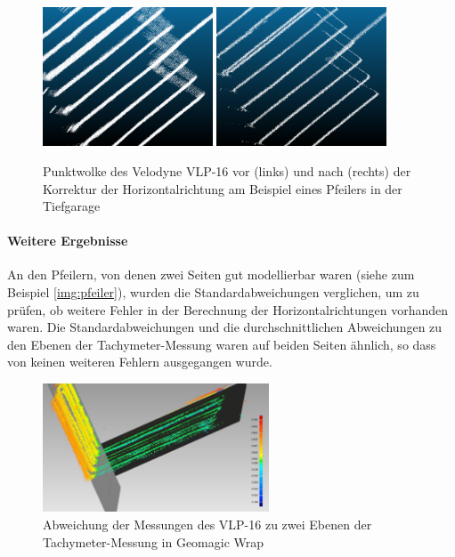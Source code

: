 \documentclass[a4paper,12pt,bibliography=totoc, listof=totoc,titlepage,pointlessnumbers]{scrreprt}
\begin{document}
\begin{figure}[!ht]
 \centering
 \includegraphics[width=0.45\textwidth]{./img/punktwolke_f.png}
 \includegraphics[width=0.45\textwidth]{./img/punktwolke_k.png}
 \caption{Punktwolke des Velodyne VLP-16 vor (links) und nach (rechts) der Korrektur der Horizontalrichtung am Beispiel eines Pfeilers in der Tiefgarage}
 \label{img:fehlerWolke}
\end{figure}

\paragraph{Weitere Ergebnisse}
An den Pfeilern, von denen zwei Seiten gut modellierbar waren (siehe zum Beispiel \autoref{img:pfeiler}), wurden die Standardabweichungen verglichen, um zu prüfen, ob weitere Fehler in der Berechnung der Horizontalrichtungen vorhanden waren. Die Standardabweichungen und die durchschnittlichen Abweichungen zu den Ebenen der Tachymeter-Messung waren auf beiden Seiten ähnlich, so dass von keinen weiteren Fehlern ausgegangen wurde.

\begin{figure}[!ht]
 \centering
 \includegraphics[width=0.60\textwidth]{./img/pfeiler.jpg}
 \caption{Abweichung der Messungen des VLP-16 zu zwei Ebenen der Tachymeter-Messung in Geomagic Wrap}
 \label{img:pfeiler}
\end{figure}
\end{document}
